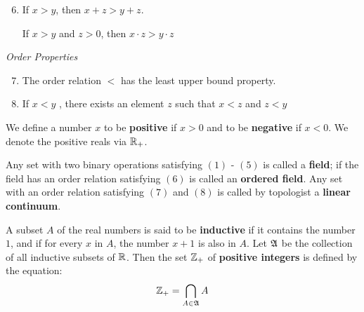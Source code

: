 \begin{enumerate}
	\setcounter{enumi}{5}
	\item If $ x > y$, then $ x +z > y+z $.
	
	If $ x > y  $ and $ z > 0 $, then $ x \cdot z > y \cdot z $
\end{enumerate}

\textit{Order Properties}

\begin{enumerate}
	\setcounter{enumi}{6}
	\item The order relation $ < $ has the least upper bound property.
	\item If $ x < y $ , there exists an element $z$ such that $ x < z$ and $ z < y$
\end{enumerate}

We define a number $x$ to be \textbf{positive} if $  x > 0 $ and to be \textbf{negative} if $ x<0 $. We denote the positive reals via $\mathbb{R}_+$.

Any set with two binary operations satisfying $(1)$ - $(5)$ is called a \textbf{field}; if the field has an order relation satisfying $ (6) $ is called an \textbf{ordered field}. Any set with an order relation satisfying $(7)$ and $(8)$ is called by topologist a \textbf{linear continuum}.

\begin{define}
	A subset $A$ of the real numbers is said to be \textbf{inductive} if it contains the number $1$, and if for every $x$ in $A$, the number $x+1$ is also in $A$. Let $\mathfrak{A}$ be the collection of all inductive subsets of $\mathbb{R}$. Then the set $\mathbb{Z}_+$ of \textbf{positive integers} is defined by the equation:
	\[ \mathbb{Z}_+ = \bigcap_{A \in \mathfrak{A}} A \]
	
\end{define}
